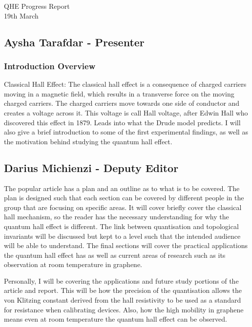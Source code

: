 \documentclass[12pt]{article}
\date{}
\newcommand{\PRLsep}{\noindent\makebox[\linewidth]{\resizebox{0.3333\linewidth}{1pt}{$\bullet$}}\bigskip}
\begin{document}
\vspace{-0.95cm}

\begin{center}
    {\Large{QHE Progress Report}}\\
    19th March
\end{center}


\subsection*{Aysha Tarafdar - Presenter}
\subsubsection*{Introduction Overview}
Classical Hall Effect: The classical hall effect is a consequence of charged carriers moving in a magnetic field,
which results in a transverse force on the moving charged carriers. The charged carriers move towards one side of
conductor and creates a voltage across it. This voltage is call Hall voltage, after Edwin Hall who discovered this effect in 1879.  
Leads into what the Drude model predicts. I will also give a brief introduction to some of the first experimental findings, as well as 
the motivation behind studying the quantum hall effect.



\vspace{0.5cm}
\PRLsep

\subsection*{Darius Michienzi - Deputy Editor}
The popular article has a plan and an outline as to what is to be covered. The plan is designed such that each section can be covered by different people in the
group that are focusing on specific areas. It will cover briefly cover the classical hall mechanism, so the reader has the necessary understanding for why the
quantum hall effect is different. The link between quantisation and topological invariants will be discussed but kept to a level such that the intended audience
will be able to understand. The final sections will cover the practical applications the quantum hall effect has as well as current areas of research such as its
observation at room temperature in graphene.
\newline

Personally, I will be covering the applications and future study portions of the article and report. This will be how the precision of the quantisation allows the
von Klitzing constant derived from the hall resistivity to be used as a standard for resistance when calibrating devices. Also, how the high mobility in graphene
means even at room temperature the quantum hall effect can be observed.
\end{document}
